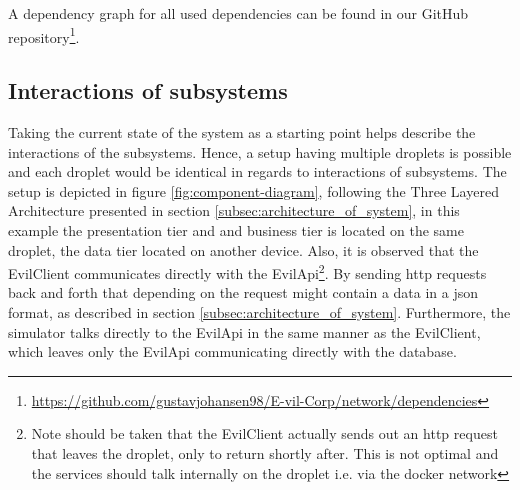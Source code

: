 \documentclass[report/main.tex]{subfiles}
\begin{document}
        A dependency graph for all used dependencies can be found in our GitHub repository\footnote{\hyperlink{Dependeny graph}{https://github.com/gustavjohansen98/E-vil-Corp/network/dependencies}}.

    \subsection{Interactions of subsystems}
        Taking the current state of the system as a starting point helps describe the interactions of the subsystems. Hence, a setup having multiple droplets is possible and each droplet would be identical in regards to interactions of subsystems. The setup is depicted in figure \ref{fig:component-diagram}, following the Three Layered Architecture presented in section \ref{subsec:architecture_of_system}, in this example the presentation tier and and business tier is located on the same droplet, the data tier located on another device. Also, it is observed that the EvilClient communicates directly with the EvilApi\footnote{Note should be taken that the EvilClient actually sends out an http request that leaves the droplet, only to return shortly after. This is not optimal and the services should talk internally on the droplet i.e. via the docker network}. By sending http requests back and forth that depending on the request might contain a data in a json format, as described in section \ref{subsec:architecture_of_system}. Furthermore, the simulator talks directly to the EvilApi in the same manner as the EvilClient, which leaves only the EvilApi communicating directly with the database.
\end{document}
